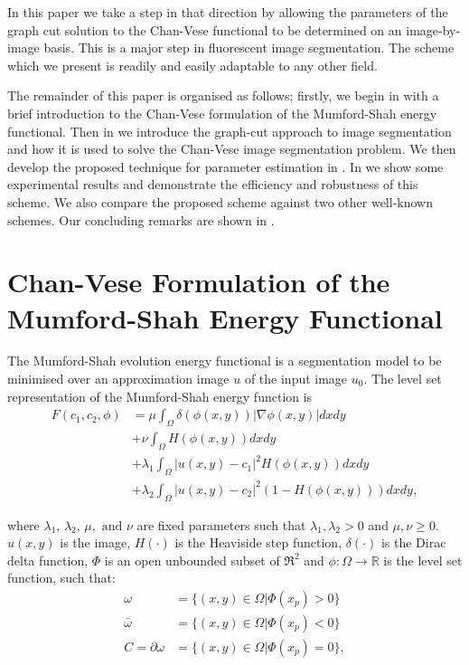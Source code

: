 \documentclass[10pt, journal, letterpaper, onecolumn, draftcls]{IEEEtran}
\begin{document}
In this paper we take a step in that direction by allowing the parameters of the graph cut solution to the Chan-Vese functional to be determined on an image-by-image basis. This is a major step in fluorescent image segmentation. The scheme which we present is readily and easily adaptable to any other field.

The remainder of this paper is organised as follows; firstly, we begin in  with a brief introduction to the Chan-Vese formulation of the  Mumford-Shah energy functional. Then in  we introduce the graph-cut approach to image segmentation and how it is used to solve the Chan-Vese image segmentation problem. We then develop the proposed technique for parameter estimation in . In  we show some experimental results and demonstrate the efficiency and robustness of this scheme. We also compare the proposed scheme against two other well-known schemes. Our concluding remarks are shown in .

\section{Chan-Vese Formulation of the Mumford-Shah Energy Functional}
\label{sec:CVformulation}
The Mumford-Shah \cite{Mumford1989} evolution energy functional is a segmentation model to be minimised over an approximation image $u$ of the input image $u_0$. The level set representation of the Mumford-Shah energy function is 
\begin{equation}
\begin{split}
	F(c_1, c_2, \phi) & = \mu \int_\Omega \delta(\phi(x,y))|\nabla\phi(x,y)|dxdy \\
	& + \nu \int_\Omega H(\phi(x,y))dxdy \\
	& + \lambda_1 \int_\Omega |u(x,y)-c_1|^2H(\phi(x,y))dxdy \\
	& + \lambda_2 \int_\Omega |u(x,y)-c_2|^2(1-H(\phi(x,y)))dxdy,
	\end{split}
	\label{eq:mumfordshahfunction}
\end{equation}

where $\lambda_1, \, \lambda_2, \, \mu, \text{ and } \nu$ are fixed parameters such that $\lambda_1, \lambda_2 > 0$ and $\mu, \nu \geq 0$.  $u(x,y)$ is the image, $H(\cdot)$ is the Heaviside step function, $\delta(\cdot)$ is the Dirac delta function, $\Phi$ is an open unbounded subset of $\Re^2$ and $\phi:\Omega \rightarrow \mathbb{R}$ is the level set function, such that:
\begin{equation}
	\begin{split}
	\omega & = \{(x,y) \in \Omega|\Phi(x_p)>0\} \\
	\bar{\omega} & = \{(x,y) \in \Omega|\Phi(x_p)<0\} \\
	C = \partial\omega & = \{(x,y) \in \Omega|\Phi(x_p)=0\},
	\end{split}
	\label{eq:levelsetrepresentation}
\end{equation}
\end{document}
